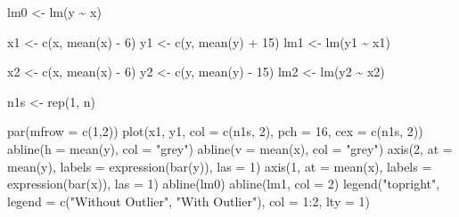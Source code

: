 \documentclass[
  letterpaper,
  DIV=11,
  numbers=noendperiod,
  oneside]{scrreprt}
\newenvironment{Shaded}{\begin{snugshade}}{\end{snugshade}}
\newcommand{\AttributeTok}[1]{\textcolor[rgb]{0.40,0.45,0.13}{#1}}
\newcommand{\DecValTok}[1]{\textcolor[rgb]{0.68,0.00,0.00}{#1}}
\newcommand{\FunctionTok}[1]{\textcolor[rgb]{0.28,0.35,0.67}{#1}}
\newcommand{\NormalTok}[1]{\textcolor[rgb]{0.00,0.23,0.31}{#1}}
\newcommand{\OtherTok}[1]{\textcolor[rgb]{0.00,0.23,0.31}{#1}}
\newcommand{\SpecialCharTok}[1]{\textcolor[rgb]{0.37,0.37,0.37}{#1}}
\newcommand{\StringTok}[1]{\textcolor[rgb]{0.13,0.47,0.30}{#1}}
\begin{document}
\begin{Shaded}
\begin{Highlighting}[]
\NormalTok{lm0 }\OtherTok{\textless{}{-}} \FunctionTok{lm}\NormalTok{(y }\SpecialCharTok{\textasciitilde{}}\NormalTok{ x)}

\NormalTok{x1 }\OtherTok{\textless{}{-}} \FunctionTok{c}\NormalTok{(x, }\FunctionTok{mean}\NormalTok{(x) }\SpecialCharTok{{-}} \DecValTok{6}\NormalTok{)}
\NormalTok{y1 }\OtherTok{\textless{}{-}} \FunctionTok{c}\NormalTok{(y, }\FunctionTok{mean}\NormalTok{(y) }\SpecialCharTok{+} \DecValTok{15}\NormalTok{)}
\NormalTok{lm1 }\OtherTok{\textless{}{-}} \FunctionTok{lm}\NormalTok{(y1 }\SpecialCharTok{\textasciitilde{}}\NormalTok{ x1)}

\NormalTok{x2 }\OtherTok{\textless{}{-}} \FunctionTok{c}\NormalTok{(x, }\FunctionTok{mean}\NormalTok{(x) }\SpecialCharTok{{-}} \DecValTok{6}\NormalTok{)}
\NormalTok{y2 }\OtherTok{\textless{}{-}} \FunctionTok{c}\NormalTok{(y, }\FunctionTok{mean}\NormalTok{(y) }\SpecialCharTok{{-}} \DecValTok{15}\NormalTok{)}
\NormalTok{lm2 }\OtherTok{\textless{}{-}} \FunctionTok{lm}\NormalTok{(y2 }\SpecialCharTok{\textasciitilde{}}\NormalTok{ x2)}

\NormalTok{n1s }\OtherTok{\textless{}{-}} \FunctionTok{rep}\NormalTok{(}\DecValTok{1}\NormalTok{, n)}

\FunctionTok{par}\NormalTok{(}\AttributeTok{mfrow =} \FunctionTok{c}\NormalTok{(}\DecValTok{1}\NormalTok{,}\DecValTok{2}\NormalTok{))}
\FunctionTok{plot}\NormalTok{(x1, y1, }\AttributeTok{col =} \FunctionTok{c}\NormalTok{(n1s, }\DecValTok{2}\NormalTok{), }
    \AttributeTok{pch =} \DecValTok{16}\NormalTok{, }\AttributeTok{cex =} \FunctionTok{c}\NormalTok{(n1s, }\DecValTok{2}\NormalTok{))}
\FunctionTok{abline}\NormalTok{(}\AttributeTok{h =} \FunctionTok{mean}\NormalTok{(y), }\AttributeTok{col =} \StringTok{"grey"}\NormalTok{)}
\FunctionTok{abline}\NormalTok{(}\AttributeTok{v =} \FunctionTok{mean}\NormalTok{(x), }\AttributeTok{col =} \StringTok{"grey"}\NormalTok{)}
\FunctionTok{axis}\NormalTok{(}\DecValTok{2}\NormalTok{, }\AttributeTok{at =} \FunctionTok{mean}\NormalTok{(y), }\AttributeTok{labels =} \FunctionTok{expression}\NormalTok{(}\FunctionTok{bar}\NormalTok{(y)), }\AttributeTok{las =} \DecValTok{1}\NormalTok{)}
\FunctionTok{axis}\NormalTok{(}\DecValTok{1}\NormalTok{, }\AttributeTok{at =} \FunctionTok{mean}\NormalTok{(x), }\AttributeTok{labels =} \FunctionTok{expression}\NormalTok{(}\FunctionTok{bar}\NormalTok{(x)), }\AttributeTok{las =} \DecValTok{1}\NormalTok{)}
\FunctionTok{abline}\NormalTok{(lm0)}
\FunctionTok{abline}\NormalTok{(lm1, }\AttributeTok{col =} \DecValTok{2}\NormalTok{)}
\FunctionTok{legend}\NormalTok{(}\StringTok{"topright"}\NormalTok{, }\AttributeTok{legend =} \FunctionTok{c}\NormalTok{(}\StringTok{"Without Outlier"}\NormalTok{, }\StringTok{"With Outlier"}\NormalTok{), }\AttributeTok{col =} \DecValTok{1}\SpecialCharTok{:}\DecValTok{2}\NormalTok{, }\AttributeTok{lty =} \DecValTok{1}\NormalTok{)}


\end{Highlighting}
\end{Shaded}
\end{document}

